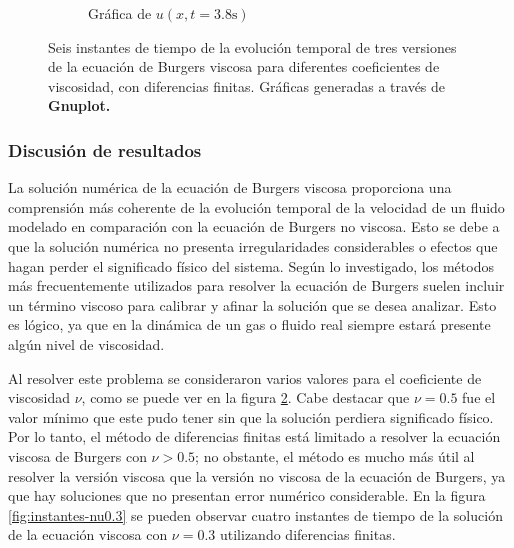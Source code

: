 \documentclass[12pt]{article}
\begin{document}
\begin{figure}[ht]
\begin{subfigure}{0.4\textwidth}
			\caption*{Gráfica de $u(x,t=3.8\unit{\second})$}
			\label{fig:vis1ddf6}
		\end{subfigure}
		\caption{Seis instantes de tiempo de la evolución temporal de tres versiones de la ecuación de Burgers viscosa para diferentes coeficientes de viscosidad, con diferencias finitas. Gráficas generadas a través de \textbf{Gnuplot.}}
		\label{fig:instantesvis1DDF}
	\end{figure}
	\subsubsection{Discusión de resultados}
	La solución numérica de la ecuación de Burgers viscosa proporciona una comprensión más coherente de la evolución temporal de la velocidad de un fluido modelado en comparación con la ecuación de Burgers no viscosa. Esto se debe a que la solución numérica no presenta irregularidades considerables o efectos que hagan perder el significado físico del sistema. Según lo investigado, los métodos más frecuentemente utilizados para resolver la ecuación de Burgers suelen incluir un término viscoso para calibrar y afinar la solución que se desea analizar. Esto es lógico, ya que en la dinámica de un gas o fluido real siempre estará presente algún nivel de viscosidad.
	
	Al resolver este problema se consideraron varios valores para el coeficiente de viscosidad $\nu$, como se puede ver en la figura \ref{fig:instantesvis1DDF}. Cabe destacar que $\nu = 0.5$ fue el valor mínimo que este pudo tener sin que la solución perdiera significado físico. Por lo tanto, el método de diferencias finitas está limitado a resolver la ecuación viscosa de Burgers con $\nu > 0.5$; no obstante, el método es mucho más útil al resolver la versión viscosa que la versión no viscosa de la ecuación de Burgers, ya que hay soluciones que no presentan error numérico considerable. En la figura \ref{fig:instantes-nu0.3} se pueden observar cuatro instantes de tiempo de la solución de la ecuación viscosa con $\nu = 0.3$ utilizando diferencias finitas.
	
\end{document}
